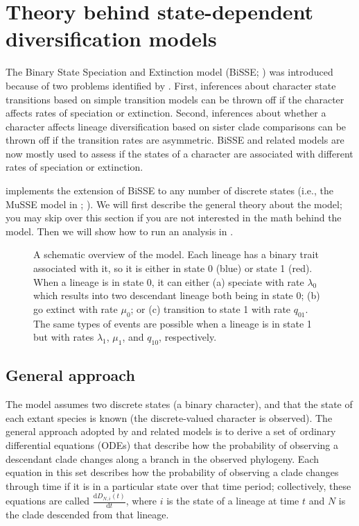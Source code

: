 \newpage
\section{Theory behind state-dependent diversification models} \label{sec:BiSSE_Theory}

The Binary State Speciation and Extinction model (BiSSE; \citealt{Maddison2007}) was introduced because of two problems identified by \citet{Maddison2006b}.
First, inferences about character state transitions based on simple transition models \citep[like][]{Pagel1999} can be thrown off if the character affects rates of speciation or extinction.
Second, inferences about whether a character affects lineage diversification based on sister clade comparisons \citep{Mitter1988} can be thrown off if the transition rates are asymmetric.
BiSSE and related models are now mostly used to assess if the states of a character are associated with different rates of speciation or extinction.

\RevBayes implements the extension of BiSSE to any number of discrete states (i.e., the MuSSE model in \diversitree; \citealt{FitzJohn2012}).
We will first describe the general theory about the model;
you may skip over this section if you are not interested in the math behind the model.
Then we will show how to run an analysis in \RevBayes.

\begin{figure}[h!]
\centering
{}
\caption{\small
    A schematic overview of the \BiSSE model.
    Each lineage has a binary trait associated with it, so it is either in state 0 (blue) or state 1 (red).
    When a lineage is in state 0, it can either (a) speciate with rate $\lambda_0$ which results into two descendant lineage both being in state 0; (b) go extinct with rate $\mu_0$; or (c) transition to state 1 with rate $q_{01}$.
    The same types of events are possible when a lineage is in state 1 but with rates $\lambda_1$, $\mu_1$, and $q_{10}$, respectively.
}
\label{fig:BiSSE_Schematic}
\end{figure}

\subsection{General approach}

The \BiSSE model assumes two discrete states (\IE a binary character), and that the state of each extant species is known (\IE the discrete-valued character is observed).
The general approach adopted by \BiSSE and related models is to derive a set of ordinary differential equations (ODEs) that describe how the probability of observing a descendant clade changes along a branch in the observed phylogeny.
Each equation in this set describes how the probability of observing a clade changes through time if it is in a particular state over that time period; collectively, these equations are called $\frac{ \mathrm{d}D_{N,i}(t)}{\mathrm{d}t}$, where $i$ is the state of a lineage at time $t$ and $N$ is the clade descended from that lineage.

